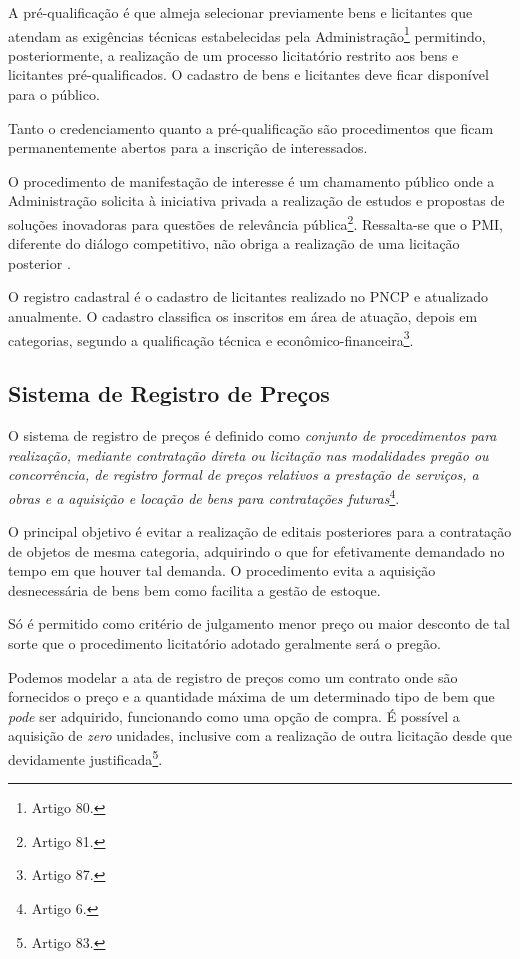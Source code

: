 A pré-qualificação é que almeja selecionar previamente bens e licitantes que atendam as exigências técnicas estabelecidas pela Administração\footnote{Artigo 80.} permitindo, posteriormente, a realização de um processo licitatório restrito aos bens e licitantes pré-qualificados. O cadastro de bens e licitantes deve ficar disponível para o público.

Tanto o credenciamento quanto a pré-qualificação são procedimentos que ficam permanentemente abertos para a inscrição de interessados.

O procedimento de manifestação de interesse é um chamamento público onde a Administração solicita à iniciativa privada a realização de estudos e propostas de soluções inovadoras para questões de relevância pública\footnote{Artigo 81.}. Ressalta-se que o PMI, diferente do diálogo competitivo, não obriga a realização de uma licitação posterior \citet{TCE2022}.

O registro cadastral é o cadastro de licitantes realizado no PNCP e atualizado anualmente. O cadastro classifica os inscritos em área de atuação, depois em categorias, segundo a qualificação técnica e econômico-financeira\footnote{Artigo 87.}.

\subsection{Sistema de Registro de Preços}
O sistema de registro de preços é definido como \emph{conjunto de procedimentos para realização, mediante contratação direta ou licitação nas modalidades pregão ou concorrência, de registro formal de preços relativos a prestação de serviços, a obras e a aquisição e locação de bens para contratações futuras}\footnote{Artigo 6.}.

O principal objetivo é evitar a realização de editais posteriores para a contratação de objetos de mesma categoria, adquirindo o que for efetivamente demandado no tempo em que houver tal demanda. O procedimento evita a aquisição desnecessária de bens bem como facilita a gestão de estoque.

Só é permitido como critério de julgamento menor preço ou maior desconto de tal sorte que o procedimento licitatório adotado geralmente será o pregão.

Podemos modelar a ata de registro de preços como um contrato onde são fornecidos o preço e a quantidade máxima de um determinado tipo de bem que \emph{pode} ser adquirido, funcionando como uma opção de compra. É possível a aquisição de \emph{zero} unidades, inclusive com a realização de outra licitação desde que devidamente justificada\footnote{Artigo 83.}.

